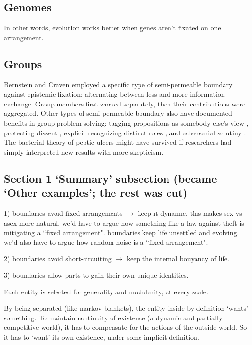 \subsection{Genomes}

In other words, evolution works better when genes aren't fixated on one arrangement.


\subsection{Groups}

Bernstein and Craven employed a specific type of semi-permeable boundary against epistemic fixation: alternating between less and more information exchange. Group members first worked separately, then their contributions were aggregated. Other types of semi-permeable boundary also have documented benefits in group problem solving: tagging propositions as somebody else's view \citep{johnson1993source}, protecting dissent \citep{sunstein2015wiser}, explicit recognizing distinct roles \citep{hutchins1995cognition}, and adversarial scrutiny \citep{longino1990science}. The bacterial theory of peptic ulcers might have survived if researchers had simply interpreted new results with more skepticism.


\subsection{Section 1 `Summary' subsection (became `Other examples'; the rest was cut)}

1) boundaries avoid fixed arrangements $\rightarrow$ keep it dynamic. this makes sex vs asex more natural. we'd have to argue how something like a law against theft is mitigating a ``fixed arrangement". boundaries keep life unsettled and evolving. we'd also have to argue how random noise is a ``fixed arrangement".

2) boundaries avoid short-circuiting $\rightarrow$ keep the internal bouyancy of life.

3) boundaries allow parts to gain their own unique identities.

Each entity is selected for generality and modularity, at every scale.

By being separated (like markov blankets), the entity inside by definition `wants' something. To maintain continuity of existence (a dynamic and partially competitive world), it has to compensate for the actions of the outside world. So it has to `want' its own existence, under some implicit definition.

